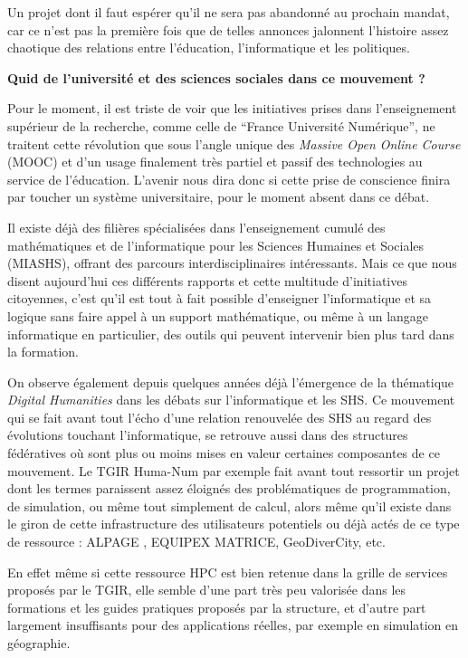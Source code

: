 Un projet dont il faut espérer qu'il ne sera pas abandonné au prochain mandat, car ce n'est pas la première fois que de telles annonces jalonnent l'histoire assez chaotique des relations entre l'éducation, l'informatique et les politiques.

\textbf{Quid de l'université et des sciences sociales dans ce mouvement ?}

Pour le moment, il est triste de voir que les initiatives prises dans l'enseignement supérieur de la recherche, comme celle de \enquote{France Université Numérique}, ne traitent cette révolution que sous l'angle unique des \textit{Massive Open Online Course} (MOOC) et d'un usage finalement très partiel et passif des technologies au service de l'éducation. L'avenir nous dira donc si cette prise de conscience finira par toucher un système universitaire, pour le moment absent dans ce débat.

Il existe déjà des filières spécialisées dans l'enseignement cumulé des mathématiques et de l'informatique pour les Sciences Humaines et Sociales (MIASHS), offrant des parcours interdisciplinaires intéressants. Mais ce que nous disent aujourd'hui ces différents rapports et cette multitude d'initiatives citoyennes, c'est qu'il est tout à fait possible d'enseigner l'informatique et sa logique sans faire appel à un support mathématique, ou même à un langage informatique en particulier, des outils qui peuvent intervenir bien plus tard dans la formation.

On observe également depuis quelques années déjà l'émergence de la thématique \textit{Digital Humanities} dans les débats sur l'informatique et les SHS. Ce mouvement qui se fait avant tout l'écho d'une relation renouvelée des SHS au regard des évolutions touchant l'informatique, se retrouve aussi dans des structures fédératives où sont plus ou moins mises en valeur certaines composantes de ce mouvement. Le TGIR Huma-Num par exemple fait avant tout ressortir un projet dont les termes paraissent assez éloignés des problématiques de programmation, de simulation, ou même tout simplement de calcul, alors même qu'il existe dans le giron de cette infrastructure des utilisateurs potentiels ou déjà actés de ce type de ressource : ALPAGE \autocite{Costa2012}, EQUIPEX MATRICE, GeoDiverCity, etc.

En effet même si cette ressource HPC est bien retenue dans la grille de services proposés par le TGIR, elle semble d'une part très peu valorisée dans les formations et les guides pratiques proposés par la structure, et d'autre part largement insuffisants pour des applications réelles, par exemple en simulation en géographie.


